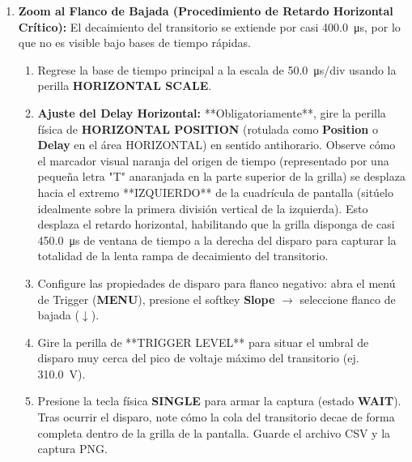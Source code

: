 \documentclass[12pt, letterpaper]{article}
\begin{document}
\begin{enumerate}
    \item \textbf{Zoom al Flanco de Bajada (Procedimiento de Retardo Horizontal Crítico):} El decaimiento del transitorio se extiende por casi \SI{400.0}{\micro\second}, por lo que no es visible bajo bases de tiempo rápidas. 
    \begin{enumerate}[label=\roman*.]
        \item Regrese la base de tiempo principal a la escala de \SI{50.0}{\micro\second/div} usando la perilla \textbf{HORIZONTAL SCALE}.
        \item \textbf{Ajuste del Delay Horizontal:} **Obligatoriamente**, gire la perilla física de \textbf{HORIZONTAL POSITION} (rotulada como \textbf{Position} o \textbf{Delay} en el área HORIZONTAL) en sentido antihorario. Observe cómo el marcador visual naranja del origen de tiempo (representado por una pequeña letra "T" anaranjada en la parte superior de la grilla) se desplaza hacia el extremo **IZQUIERDO** de la cuadrícula de pantalla (sitúelo idealmente sobre la primera división vertical de la izquierda). Esto desplaza el retardo horizontal, habilitando que la grilla disponga de casi \SI{450.0}{\micro\second} de ventana de tiempo a la derecha del disparo para capturar la totalidad de la lenta rampa de decaimiento del transitorio.
        \item Configure las propiedades de disparo para flanco negativo: abra el menú de Trigger (\textbf{MENU}), presione el softkey \textbf{Slope} $\rightarrow$ seleccione flanco de bajada ($\downarrow$).
        \item Gire la perilla de **TRIGGER LEVEL** para situar el umbral de disparo muy cerca del pico de voltaje máximo del transitorio (ej. \SI{310.0}{\volt}).
        \item Presione la tecla física \textbf{SINGLE} para armar la captura (estado \textbf{WAIT}). Tras ocurrir el disparo, note cómo la cola del transitorio decae de forma completa dentro de la grilla de la pantalla. Guarde el archivo CSV y la captura PNG.
    \end{enumerate}
\end{enumerate}
\end{document}

